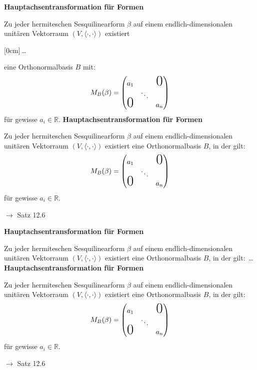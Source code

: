 \documentclass[11pt]{article}
\renewcommand{\cite}[1]{\par\bigskip\hfill{\color{gray}\tiny\(\to\) #1}}
\newcommand{\RR}{\mathbb{R}}
\newcommand*{\scprod}[2]{\langle #1, #2\rangle} %
\newcommand{\hide}[1]{\parbox{0cm}{\raisebox{-7pt}[0cm]{\dots}}\color{white}#1\color{black}}
\let\olddots\dots
\renewcommand{\dots}{\,\olddots\,}
\newenvironment{field}{}{\newpage}
\newif\ifnote
\newenvironment{note}{\notetrue}{\notefalse}
\begin{document}
\begin{note}
    \begin{field}
        \textbf{Hauptachsentransformation für Formen}

        Zu jeder hermiteschen Sesquilinearform $\beta$ auf einem endlich-dimensionalen unitären Vektorraum $(V,\scprod{\cdot}{\cdot})$ existiert \hide{eine Orthonormalbasis $B$} mit:
        \[M_B(\beta) = \begin{pmatrix}
            a_1&&\text{\huge 0}\\
            & \ddots&\\
            \smash{\text{\huge 0}}&& a_n
        \end{pmatrix}\]
        für gewisse $a_i\in\RR$.
    \end{field}
    \begin{field}
        \textbf{Hauptachsentransformation für Formen}

        Zu jeder hermiteschen Sesquilinearform $\beta$ auf einem endlich-dimensionalen unitären Vektorraum $(V,\scprod{\cdot}{\cdot})$ existiert eine Orthonormalbasis $B$, in der gilt:
        \[M_B(\beta) = \begin{pmatrix}
            a_1&&\text{\huge 0}\\
            & \ddots&\\
            \smash{\text{\huge 0}}&& a_n
        \end{pmatrix}\]
        für gewisse $a_i\in\RR$.
        \cite{Satz 12.6}
    \end{field}

    \begin{field}
        \textbf{Hauptachsentransformation für Formen}

        Zu jeder hermiteschen Sesquilinearform $\beta$ auf einem endlich-dimensionalen unitären Vektorraum $(V,\scprod{\cdot}{\cdot})$ existiert eine Orthonormalbasis $B$, in der gilt: \dots
    \end{field}
    \begin{field}
        \textbf{Hauptachsentransformation für Formen}

        Zu jeder hermiteschen Sesquilinearform $\beta$ auf einem endlich-dimensionalen unitären Vektorraum $(V,\scprod{\cdot}{\cdot})$ existiert eine Orthonormalbasis $B$, in der gilt:
        \[M_B(\beta) = \begin{pmatrix}
            a_1&&\text{\huge 0}\\
            & \ddots&\\
            \smash{\text{\huge 0}}&& a_n
        \end{pmatrix}\]
        für gewisse $a_i\in\RR$.
        \cite{Satz 12.6}
    \end{field}
\end{note}
\end{document}
